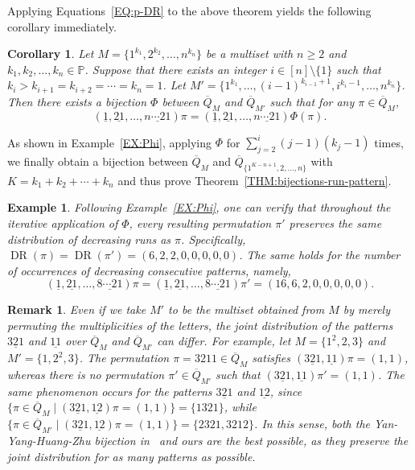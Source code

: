 \documentclass[11pt]{article}
\DeclareMathOperator{\DR}{DR}
\numberwithin{equation}{section}
\newtheorem{cor}[thm]{Corollary}
\newtheorem{rem}[thm]{Remark}
\newtheorem{exa}[thm]{Example}
\def\bP{\mathbb P}
\def\oQ{\overline{Q}}
\begin{document}
Applying Equations~\eqref{EQ:p-DR} to the above theorem yields the following corollary immediately.

\begin{cor}\label{COR:bijections-pattern}
	Let $M=\{1^{k_1},2^{k_2},\ldots,n^{k_n}\}$ be a multiset with $n\geq2$ and $k_1,k_2,\ldots,k_n\in\bP$. Suppose that there exists an integer $i\in[n]\setminus\{1\}$ such that $k_{i}>k_{i+1}=k_{i+2}=\cdots=k_n=1$. Let $M'=\{1^{k_1},\ldots,(i-1)^{k_{i-1}+1},i^{k_{i}-1},\ldots,n^{k_n}\}$. Then there exists a bijection $\Phi$ between $\overline{Q}_M$ and $\overline{Q}_{M'}$ such that for any $\pi\in\oQ_M$, 
	\[(\underline{1},\underline{21},\ldots,\underline{n\cdots21})\pi=(\underline{1},\underline{21},\ldots,\underline{n\cdots21})\Phi(\pi).\]
\end{cor}

As shown in Example~\ref{EX:Phi}, applying $\Phi$ for $\sum_{j=2}^i(j-1)(k_j-1)$ times, we finally obtain a bijection between $\oQ_M$ and $\oQ_{\{1^{K-n+1},2,\ldots,n\}}$ with $K=k_1+k_2+\cdots+k_n$ and thus prove Theorem~\ref{THM:bijections-run-pattern}.


\begin{exa}
	Following Example~\ref{EX:Phi}, one can verify that throughout the iterative application of $\Phi$, every resulting permutation $\pi'$ preserves the same distribution of decreasing runs as $\pi$. Specifically, $\DR(\pi)=\DR(\pi')=(6,2,2,0,0,0,0,0)$. The same holds for the number of occurrences of decreasing consecutive patterns, namely, $$(\underline{1},\underline{21},\ldots,\underline{8\cdots21})\pi=(\underline{1},\underline{21},\ldots,\underline{8\cdots21})\pi'=(16,6,2,0,0,0,0,0).$$
\end{exa}

\begin{rem}
	Even if we take $M'$ to be the multiset obtained from $M$ by merely permuting the multiplicities of the letters, the joint distribution of the patterns $\underline{321}$ and $\underline{11}$ over $\oQ_M$ and $\oQ_{M'}$ can differ. For example, let $M=\{1^2,2,3\}$ and $M'=\{1,2^2,3\}$. The permutation $\pi=3211\in\oQ_M$ satisfies $(\underline{321},\underline{11})\pi=(1,1)$, whereas there is no permutation $\pi'\in\oQ_{M'}$ such that $(\underline{321},\underline{11})\pi'=(1,1)$. The same phenomenon occurs for the patterns $\underline{321}$ and $\underline{12}$, since $\{\pi\in\oQ_M \mid (\underline{321},\underline{12})\pi=(1,1)\}=\{1321\}$, while $\{\pi\in\oQ_{M'} \mid (\underline{321},\underline{12})\pi=(1,1)\}=\{2321,3212\}$. In this sense, both the Yan-Yang-Huang-Zhu bijection in~\cite{YanYangHuangZhu2022} and ours are the best possible, as they preserve the joint distribution for as many patterns as possible.
\end{rem}
\end{document}
